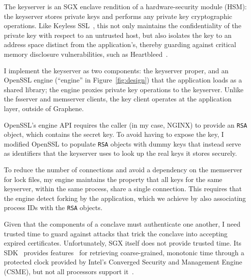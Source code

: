 %
The keyserver is an SGX enclave rendition of a hardware-security module
(HSM): the keyserver stores private keys and performs any private key
cryptographic operations.
%
Like Keyless SSL~\cite{keyless-ssl}, this not only maintains the
confidentiality of the private key with respect to an untrusted host,
but also isolates the key to an address space distinct from the
application's, thereby guarding against critical memory disclosure
vulnerabilities, such as Heartbleed~\cite{heartbleed-cve}.


I implement the keyserver as two components: the keyserver proper, and an
OpenSSL engine (``engine'' in Figure~\ref{fig:design}) that the application
loads as a shared library; the engine proxies private key operations to the
keyserver.
%
Unlike the fsserver and memserver clients, the key client operates at
the application layer, outside of Graphene.


OpenSSL's engine API requires the caller (in my case, NGINX) to provide an
\texttt{RSA} object, which contains the secret key.
%
To avoid having to expose the key, I modified OpenSSL to populate
\texttt{RSA} objects with dummy keys that instead serve as identifiers
that the keyserver uses to look up the real keys it stores securely.


To reduce the number of connections and avoid a dependency on the memserver for
lock files, my engine maintains the property that all keys for the same
keyserver, within the same process, share a single connection.
%
This requires that the engine detect forking by the application, which we
achieve by also associating process IDs with the \texttt{RSA} objects.


%
Given that the components of a conclave must authenticate one another,
I need trusted time to guard against attacks that 
trick the conclave into accepting expired certificates.
%
Unfortunately, SGX itself does not provide trusted time.  
%
Its SDK~\cite{sgx-linux-sdk} provides features~\cite{sgx-trusted-time}
for retrieving coarse-grained, monotonic time through a protected clock
provided by Intel's Converged Security and Management Engine (CSME),
but not all processors support it~\cite{ayeks-sgx-hardware}.
%



